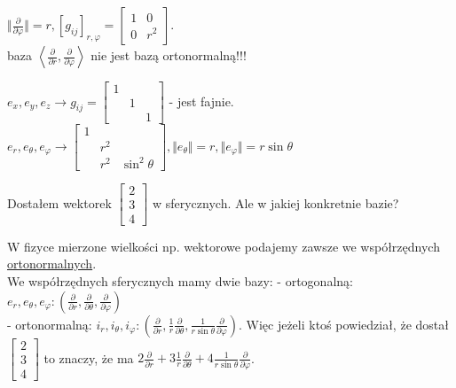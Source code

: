 \documentclass[../main.tex]{subfiles}
\begin{document}
    $\Vert \frac{\partial }{\partial \varphi}  \Vert = r,  \left[ g_{ij} \right]_{r,\varphi} = \begin{bmatrix} 1&0\\0&r^2 \end{bmatrix}$. \\
baza $\left<\frac{\partial }{\partial r} , \frac{\partial }{\partial \varphi}  \right>$ nie jest bazą ortonormalną!!!

$e_x,e_y,e_z \to g_{ij} = \begin{bmatrix} 1&&\\&1&\\&&1 \end{bmatrix} $ - jest fajnie.\\
$e_r,e_\theta,e_\varphi \to \begin{bmatrix} 1&&\\&r^2&\\&r^2&\sin^2\theta \end{bmatrix}, \Vert e_\theta \Vert = r, \Vert e_\varphi \Vert = r\sin\theta $
\begin{przyklad}
    Dostałem wektorek $\begin{bmatrix} 2\\3\\4 \end{bmatrix} $ w sferycznych. Ale w jakiej konkretnie bazie?
\end{przyklad}
W fizyce mierzone wielkości np. wektorowe podajemy zawsze we współrzędnych \underline{ortonormalnych}.\\
We współrzędnych sferycznych mamy dwie bazy:
- ortogonalną: $e_r, e_\theta, e_\varphi: \left( \frac{\partial }{\partial r} , \frac{\partial }{\partial \theta} , \frac{\partial }{\partial \varphi}  \right) $ \\
- ortonormalną: $i_r, i_\theta, i_\varphi: \left( \frac{\partial }{\partial r} , \frac{1}{r}\frac{\partial }{\partial \theta} , \frac{1}{r\sin\theta}\frac{\partial }{\partial \varphi}  \right) $.
Więc jeżeli ktoś powiedział, że dostał $\begin{bmatrix} 2\\3\\4 \end{bmatrix} $ to znaczy, że ma $2 \frac{\partial }{\partial r} + 3 \frac{1}{r} \frac{\partial }{\partial \theta} + 4 \frac{1}{r\sin\theta} \frac{\partial }{\partial \varphi} $.
\end{document}
